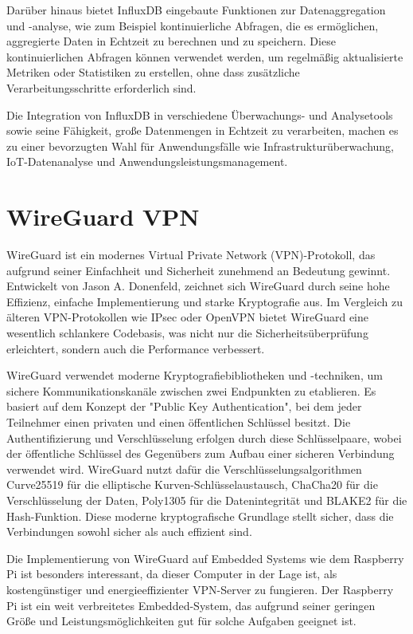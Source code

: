 \documentclass[oneside]{ausarbeitung}
\begin{document}
Darüber hinaus bietet InfluxDB eingebaute Funktionen zur Datenaggregation und -analyse, wie zum Beispiel kontinuierliche Abfragen, die es ermöglichen, aggregierte Daten in Echtzeit zu berechnen und zu speichern. Diese kontinuierlichen Abfragen können verwendet werden, um regelmäßig aktualisierte Metriken oder Statistiken zu erstellen, ohne dass zusätzliche Verarbeitungsschritte erforderlich sind.

Die Integration von InfluxDB in verschiedene Überwachungs- und Analysetools sowie seine Fähigkeit, große Datenmengen in Echtzeit zu verarbeiten, machen es zu einer bevorzugten Wahl für Anwendungsfälle wie Infrastrukturüberwachung, IoT-Datenanalyse und Anwendungsleistungsmanagement.

\section{WireGuard VPN}
\label{sec:foundations_wireguard}
WireGuard ist ein modernes Virtual Private Network (VPN)-Protokoll, das aufgrund seiner Einfachheit und Sicherheit zunehmend an Bedeutung gewinnt. Entwickelt von Jason A. Donenfeld, zeichnet sich WireGuard durch seine hohe Effizienz, einfache Implementierung und starke Kryptografie aus. Im Vergleich zu älteren VPN-Protokollen wie IPsec oder OpenVPN bietet WireGuard eine wesentlich schlankere Codebasis, was nicht nur die Sicherheitsüberprüfung erleichtert, sondern auch die Performance verbessert.

WireGuard verwendet moderne Kryptografiebibliotheken und -techniken, um sichere Kommunikationskanäle zwischen zwei Endpunkten zu etablieren. Es basiert auf dem Konzept der "Public Key Authentication", bei dem jeder Teilnehmer einen privaten und einen öffentlichen Schlüssel besitzt. Die Authentifizierung und Verschlüsselung erfolgen durch diese Schlüsselpaare, wobei der öffentliche Schlüssel des Gegenübers zum Aufbau einer sicheren Verbindung verwendet wird. WireGuard nutzt dafür die Verschlüsselungsalgorithmen Curve25519 für die elliptische Kurven-Schlüsselaustausch, ChaCha20 für die Verschlüsselung der Daten, Poly1305 für die Datenintegrität und BLAKE2 für die Hash-Funktion. Diese moderne kryptografische Grundlage stellt sicher, dass die Verbindungen sowohl sicher als auch effizient sind.

Die Implementierung von WireGuard auf Embedded Systems wie dem Raspberry Pi ist besonders interessant, da dieser Computer in der Lage ist, als kostengünstiger und energieeffizienter VPN-Server zu fungieren. Der Raspberry Pi ist ein weit verbreitetes Embedded-System, das aufgrund seiner geringen Größe und Leistungsmöglichkeiten gut für solche Aufgaben geeignet ist.
\end{document}
